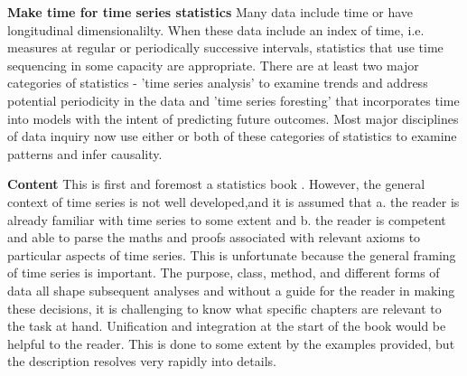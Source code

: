 \documentclass[bookreview]{jss}
\begin{document}
\textbf{Make time for time series statistics} \newline
Many data include time or have longitudinal dimensionalilty. When these data include an index of time, i.e. measures at regular or periodically successive intervals, statistics that use time sequencing in some capacity are appropriate. There are at least two major categories of statistics - 'time series analysis' to examine trends and address potential periodicity in the data and 'time series foresting' that incorporates time into models with the intent of predicting future outcomes. Most major disciplines of data inquiry now use either or both of these categories of statistics to examine patterns and infer causality. 


\textbf{Content} \newline
This is first and foremost a statistics book \citep{Woodward}. However, the general context of time series is not well developed,and it is assumed that a. the reader is already familiar with time series to some extent and b. the reader is competent and able to parse the maths and proofs associated with relevant axioms to particular aspects of time series. This is unfortunate because the general framing of time series is important. The purpose, class, method, and different forms of data all shape subsequent analyses and without a guide for the reader in making these decisions, it is challenging to know what specific chapters are relevant to the task at hand. Unification and integration at the start of the book would be helpful to the reader. This is done to some extent by the examples provided, but the description resolves very rapidly into details.



\end{document}
